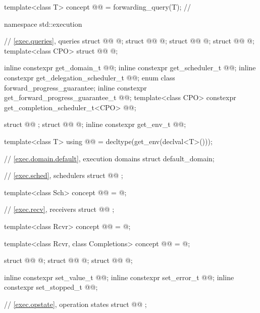 \begin{codeblock}
{  template<class T>
    concept @@ = forwarding_query(T{});           // \expos
}

namespace std::execution {
  // \ref{exec.queries}, queries
  struct @@ { @\unspec@ };
  struct @@ { @\unspec@ };
  struct @@ { @\unspec@ };
  struct @@ { @\unspec@ };
  template<class CPO>
    struct @@ { @\unspec@ };

  inline constexpr get_domain_t @@{};
  inline constexpr get_scheduler_t @@{};
  inline constexpr get_delegation_scheduler_t @@{};
  enum class forward_progress_guarantee;
  inline constexpr get_forward_progress_guarantee_t @@{};
  template<class CPO>
    constexpr get_completion_scheduler_t<CPO> @@{};

  struct @@ {};
  struct @@ { @\unspec@ };
  inline constexpr get_env_t @@{};

  template<class T>
    using @@ = decltype(get_env(declval<T>()));

  // \ref{exec.domain.default}, execution domains
  struct default_domain;

  // \ref{exec.sched}, schedulers
  struct @@ {};

  template<class Sch>
    concept @@ = @\seebelow@;

  // \ref{exec.recv}, receivers
  struct @@ {};

  template<class Rcvr>
    concept @@ = @\seebelow@;

  template<class Rcvr, class Completions>
    concept @@ = @\seebelow@;

  struct @@ { @\unspec@ };
  struct @@ { @\unspec@ };
  struct @@ { @\unspec@ };

  inline constexpr set_value_t @@{};
  inline constexpr set_error_t @@{};
  inline constexpr set_stopped_t @@{};

  // \ref{exec.opstate}, operation states
  struct @@ {};

}
\end{codeblock}

